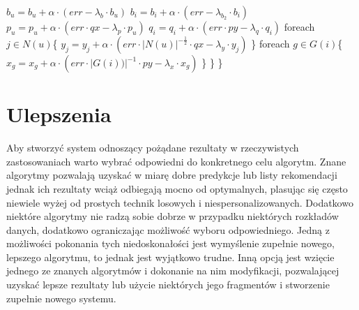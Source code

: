 \documentclass{pracamgr}
\begin{document}
    \hspace*{48pt}			$b_u=b_u+\alpha\cdot(err-\lambda_b\cdot b_u)$\newline
    \hspace*{48pt}			$b_i=b_i+\alpha\cdot(err-\lambda_{b_2}\cdot b_i)$\newline
    \hspace*{48pt}			$p_u=p_u+\alpha\cdot(err\cdot qx-\lambda_p\cdot p_u)$\newline
    \hspace*{48pt}			$q_i=q_i+\alpha\cdot(err\cdot py-\lambda_q\cdot q_i)$\newline
    \hspace*{48pt}			foreach $j\in N(u)$\{\newline
    \hspace*{64pt}				$y_j=y_j+\alpha\cdot(err\cdot |N(u)|^{-\frac{1}{2}}\cdot qx-\lambda_y\cdot y_j)$\newline
    \hspace*{48pt}			\}\newline
    \hspace*{48pt}			foreach $g\in G(i)$\{\newline
    \hspace*{64pt}				$x_g=x_g+\alpha\cdot(err\cdot |G(i))|^{-1}\cdot py-\lambda_x\cdot x_g)$\newline
    \hspace*{48pt}			\}\newline
    \hspace*{32pt}		\}\newline
    \hspace*{16pt}	\}\newline
 \chapter{Ulepszenia}
  Aby stworzyć system odnoszący pożądane rezultaty w rzeczywistych zastosowaniach warto wybrać odpowiedni do konkretnego celu algorytm.
  Znane algorytmy pozwalają uzyskać w miarę dobre predykcje lub listy rekomendacji jednak ich rezultaty wciąż odbiegają mocno od optymalnych,
  plasując się często niewiele wyżej od prostych technik losowych i niespersonalizowanych.
  Dodatkowo niektóre algorytmy nie radzą sobie dobrze w przypadku niektórych rozkładów danych, dodatkowo ograniczając możliwość wyboru odpowiedniego.
  Jedną z możliwości pokonania tych niedoskonałości jest wymyślenie zupełnie nowego, lepszego algorytmu, to jednak jest wyjątkowo trudne.
  Inną opcją jest wzięcie jednego ze znanych algorytmów i dokonanie na nim modyfikacji, pozwalającej uzyskać lepsze rezultaty
  lub użycie niektórych jego fragmentów i stworzenie zupełnie nowego systemu.
 
\end{document}
